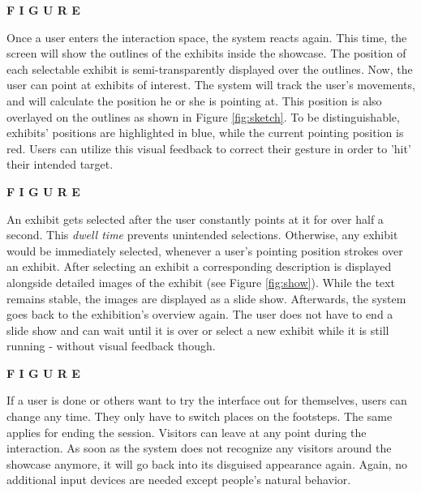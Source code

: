 \textbf{F I G U R E}

Once a user enters the interaction space, the system reacts again. This time, the screen will show the outlines of the exhibits inside the showcase. The position of each selectable exhibit is semi-transparently displayed over the outlines. Now, the user can point at exhibits of interest. The system will track the user's movements, and will calculate the position he or she is pointing at. This position is also overlayed on the outlines as shown in Figure \ref{fig:sketch}. To be distinguishable, exhibits' positions are  highlighted in blue, while the current pointing position is red. Users can utilize this visual feedback to correct their gesture in order to 'hit' their intended target.

\textbf{F I G U R E}

An exhibit gets selected after the user constantly points at it for over half a second. This \textit{dwell time} prevents unintended selections. Otherwise, any exhibit would be immediately selected, whenever a user's pointing position strokes over an exhibit. After selecting an exhibit a corresponding description is displayed alongside detailed images of the exhibit (see Figure \ref{fig:show}). While the text remains stable, the images are displayed as a slide show. Afterwards, the system goes back to the exhibition's overview again. The user does not have to end a slide show and can wait until it is over or select a new exhibit while it is still running - without visual feedback though.

\textbf{F I G U R E}

If a user is done or others want to try the interface out for themselves, users can change any time. They only have to switch places on the footsteps. The same applies for ending the session. Visitors can leave at any point during the interaction. As soon as the system does not recognize any visitors around the showcase anymore, it will go back into its disguised appearance again. Again, no additional input devices are needed except people's natural behavior.

